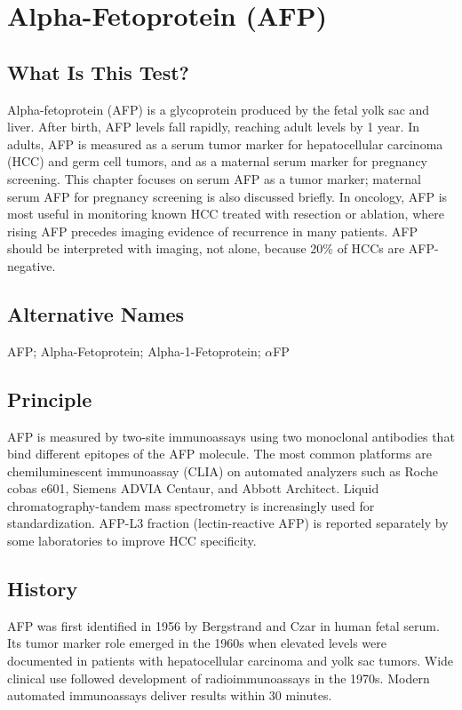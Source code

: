 \chapter{Alpha-Fetoprotein (AFP)}

\section*{What Is This Test?}
Alpha-fetoprotein (AFP) is a glycoprotein produced by the fetal yolk sac and liver. After birth, AFP levels fall rapidly, reaching adult levels by 1 year. In adults, AFP is measured as a serum tumor marker for hepatocellular carcinoma (HCC) and germ cell tumors, and as a maternal serum marker for pregnancy screening. This chapter focuses on serum AFP as a tumor marker; maternal serum AFP for pregnancy screening is also discussed briefly. In oncology, AFP is most useful in monitoring known HCC treated with resection or ablation, where rising AFP precedes imaging evidence of recurrence in many patients. AFP should be interpreted with imaging, not alone, because 20\% of HCCs are AFP-negative.

\section*{Alternative Names}
AFP; Alpha-Fetoprotein; Alpha-1-Fetoprotein; $\alpha$FP

\section*{Principle}
AFP is measured by two-site immunoassays using two monoclonal antibodies that bind different epitopes of the AFP molecule. The most common platforms are chemiluminescent immunoassay (CLIA) on automated analyzers such as Roche cobas e601, Siemens ADVIA Centaur, and Abbott Architect. Liquid chromatography-tandem mass spectrometry is increasingly used for standardization. AFP-L3 fraction (lectin-reactive AFP) is reported separately by some laboratories to improve HCC specificity.

\section*{History}
AFP was first identified in 1956 by Bergstrand and Czar in human fetal serum. Its tumor marker role emerged in the 1960s when elevated levels were documented in patients with hepatocellular carcinoma and yolk sac tumors. Wide clinical use followed development of radioimmunoassays in the 1970s. Modern automated immunoassays deliver results within 30 minutes.

